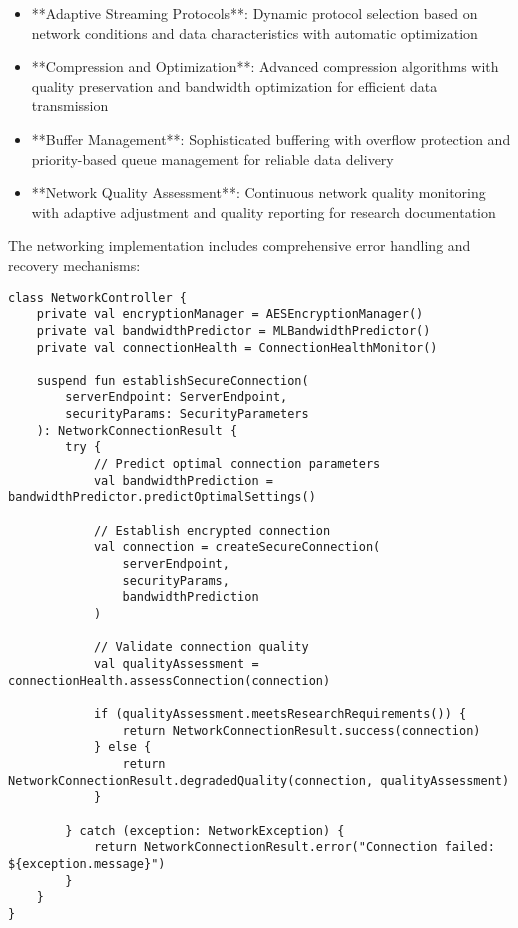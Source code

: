 \documentclass[11pt,a4paper]{report}
\begin{document}
\begin{itemize}
\item **Adaptive Streaming Protocols**: Dynamic protocol selection based on network conditions and data characteristics with
  automatic optimization
\item **Compression and Optimization**: Advanced compression algorithms with quality preservation and bandwidth optimization
  for efficient data transmission
\item **Buffer Management**: Sophisticated buffering with overflow protection and priority-based queue management for
  reliable data delivery
\item **Network Quality Assessment**: Continuous network quality monitoring with adaptive adjustment and quality reporting
  for research documentation

\end{itemize}
The networking implementation includes comprehensive error handling and recovery mechanisms:

\begin{verbatim}
class NetworkController {
    private val encryptionManager = AESEncryptionManager()
    private val bandwidthPredictor = MLBandwidthPredictor()
    private val connectionHealth = ConnectionHealthMonitor()

    suspend fun establishSecureConnection(
        serverEndpoint: ServerEndpoint,
        securityParams: SecurityParameters
    ): NetworkConnectionResult {
        try {
            // Predict optimal connection parameters
            val bandwidthPrediction = bandwidthPredictor.predictOptimalSettings()

            // Establish encrypted connection
            val connection = createSecureConnection(
                serverEndpoint,
                securityParams,
                bandwidthPrediction
            )

            // Validate connection quality
            val qualityAssessment = connectionHealth.assessConnection(connection)

            if (qualityAssessment.meetsResearchRequirements()) {
                return NetworkConnectionResult.success(connection)
            } else {
                return NetworkConnectionResult.degradedQuality(connection, qualityAssessment)
            }

        } catch (exception: NetworkException) {
            return NetworkConnectionResult.error("Connection failed: ${exception.message}")
        }
    }
}
\end{verbatim}
\end{document}
